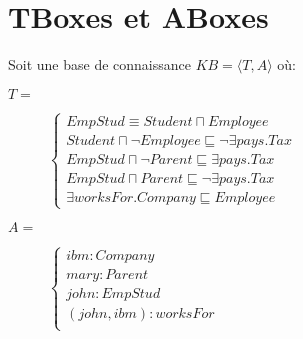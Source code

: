 \section{TBoxes et ABoxes}
Soit une base de connaissance $KB = \langle T,A \rangle$ où:
\begin{description}
\item[$T = $] 
$\begin{cases}
EmpStud \equiv Student \sqcap Employee \\
Student \sqcap \neg Employee \sqsubseteq \neg \exists pays.Tax \\
EmpStud \sqcap \neg Parent \sqsubseteq \exists pays.Tax \\
EmpStud \sqcap Parent \sqsubseteq \neg \exists pays.Tax \\
\exists worksFor.Company \sqsubseteq Employee
\end{cases}$
\item[$A = $]
$\begin{cases}
ibm:Company \\
mary :Parent \\
john:EmpStud \\
(john,ibm):worksFor \\
\end{cases}$
\end{description}
\pagebreak